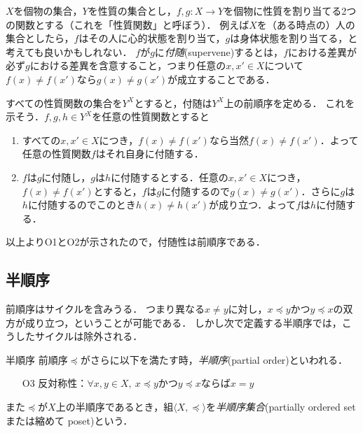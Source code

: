 \documentclass[dvipdfmx,11pt,a4paper]{jsarticle}
\begin{document}
\begin{example}[Supervenience] \label{supervenience}
 $X$を個物の集合，$Y$を性質の集合とし，$f, g:X \to Y$を個物に性質を割り当てる2つの関数とする（これを「性質関数」と呼ぼう）．
 例えば$X$を（ある時点の）人の集合としたら，$f$はその人に心的状態を割り当て，$g$は身体状態を割り当てる，と考えても良いかもしれない．
 $f$が$g$に\emph{付随}(supervene)するとは，$f$における差異が必ず$g$における差異を含意すること，つまり任意の$x, x' \in X$について$f(x) \neq f(x')$なら$g(x) \neq g(x')$が成立することである．

 すべての性質関数の集合を$Y^X$とすると，付随は$Y^X$上の前順序を定める．
 これを示そう．$f, g, h \in Y^X$を任意の性質関数とすると
 \begin{enumerate}
  \item すべての$x, x' \in X$につき，$f(x) \neq f(x')$なら当然$f(x) \neq f(x')$．よって任意の性質関数$f$はそれ自身に付随する．
  \item $f$は$g$に付随し，$g$は$h$に付随するとする．任意の$x, x' \in X$につき，$f(x) \neq f(x')$とすると，$f$は$g$に付随するので$g(x) \neq g(x')$．さらに$g$は$h$に付随するのでこのとき$h(x) \neq h(x')$が成り立つ．よって$f$は$h$に付随する．
 \end{enumerate}
以上よりO1とO2が示されたので，付随性は前順序である．
\end{example}

   
\subsection{半順序}
前順序はサイクルを含みうる．
つまり異なる$x \neq y$に対し，$x \preceq y$かつ$y \preceq x$の双方が成り立つ，ということが可能である．
しかし次で定義する半順序では，こうしたサイクルは除外される．

\begin{itembox}[l]{半順序}
前順序$\preceq$がさらに以下を満たす時，\emph{半順序}(partial order)といわれる．
\begin{itemize}
 \item[O3] 反対称性：$\forall x, y \in X, \ x \preceq y$かつ$y \preceq x$ならば$x = y$
\end{itemize}
また$\preceq$が$X$上の半順序であるとき，組$\langle X, \preceq \rangle$を\emph{半順序集合}(partially ordered set または縮めて poset)という．
\end{itembox}
\end{document}
